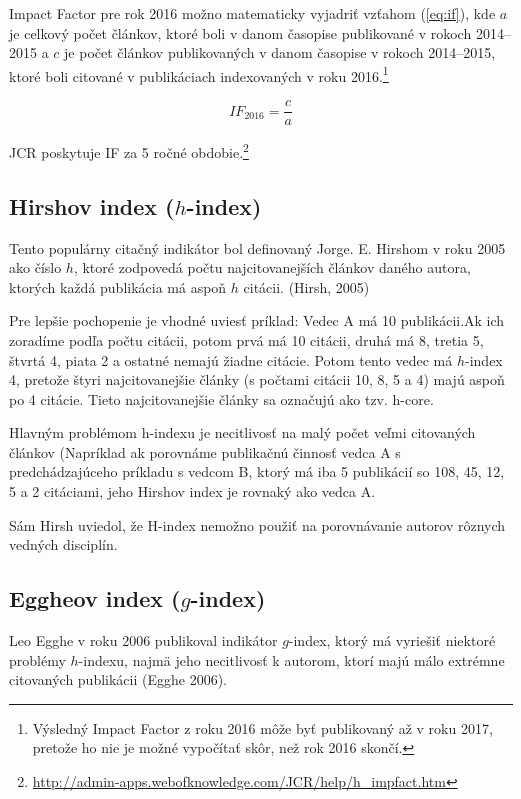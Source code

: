 Impact Factor pre rok 2016 možno matematicky vyjadriť vzťahom (\ref{eq:if}), kde
$a$ je celkový počet článkov, ktoré boli v danom časopise publikované v rokoch
2014--2015 a $c$ je počet článkov publikovaných v danom časopise v rokoch
2014--2015, ktoré boli citované v publikáciach indexovaných v roku
2016.\footnote{Výsledný Impact Factor z roku 2016 môže byť publikovaný až v roku
  2017, pretože ho nie je možné vypočítať skôr, než rok 2016 skončí.}

\begin{equation}
\label{eq:if}
\mathit{IF}_{2016} = \frac{c}{a}
\end{equation}

JCR poskytuje IF za 5 ročné obdobie.\footnote{\url{http://admin-apps.webofknowledge.com/JCR/help/h_impfact.htm}}


\subsection{Hirshov index ($h$-index)}

Tento populárny citačný indikátor bol definovaný Jorge. E. Hirshom v roku 2005
ako číslo $h$, ktoré zodpovedá počtu najcitovanejších článkov daného autora,
ktorých každá publikácia má aspoň $h$ citácii. (Hirsh, 2005)

Pre lepšie pochopenie je vhodné uviesť príklad:
Vedec A má 10 publikácii.Ak ich zoradíme podľa počtu citácii, potom prvá má 10
citácii, druhá má 8, tretia 5, štvrtá 4, piata 2 a ostatné nemajú žiadne
citácie. Potom tento vedec má $h$-index 4, pretože štyri najcitovanejšie články (s
počtami citácii 10, 8, 5 a 4) majú aspoň po 4 citácie. Tieto najcitovanejšie
články sa označujú ako tzv. h-core.

Hlavným problémom h-indexu je necitlivosť na malý počet veľmi citovaných článkov
(Napríklad ak porovnáme publikačnú činnosť vedca A s predchádzajúceho príkladu s
vedcom B, ktorý má iba 5 publikácií so 108, 45, 12, 5 a 2 citáciami, jeho
Hirshov index je rovnaký ako vedca A.

Sám Hirsh uviedol, že H-index nemožno použiť na porovnávanie autorov rôznych
vedných disciplín.


\subsection{Eggheov index ($g$-index)}

Leo Egghe v roku 2006 publikoval indikátor $g$-index, ktorý má vyriešiť niektoré
problémy $h$-indexu, najmä jeho necitlivosť k autorom, ktorí majú málo extrémne
citovaných publikácii (Egghe 2006).

